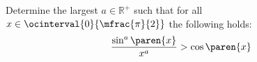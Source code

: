 Determine the largest $a \in \mathbb{R}^{+}$ such that
for all $x \in \ocinterval{0}{\mfrac{\pi}{2}}$ the following holds:
\begin{equation*}
  \frac{\sin^{a}\paren{x}}{x^a}
  > \cos\paren{x}
\end{equation*}
